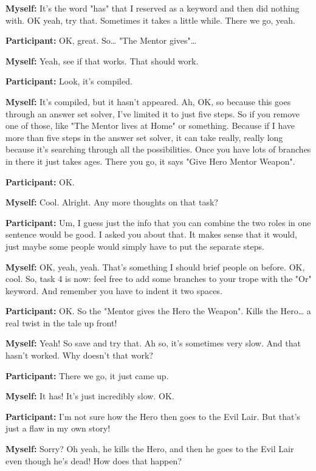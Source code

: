 \documentclass[11pt]{report}
\newcommand{\llabel}[1]{\hypertarget{llineno:#1}{\linelabel{#1}}}
\begin{document}
\begin{linenumbers}
\textbf{Myself:} It's the word "has" that I reserved as a keyword and then did nothing with. OK yeah, try that. Sometimes it takes a little while. There we go, yeah.

\textbf{Participant:} OK, great. So\ldots{} "The Mentor gives"\ldots{}

\textbf{Myself:} Yeah, see if that works. That should work.

\textbf{Participant:} Look, it's compiled.

\textbf{Myself:} It's compiled, but it hasn't appeared. Ah, OK, so because this
goes through an answer set solver, I've limited it to just five steps. So if you
remove one of those, like "The Mentor lives at Home" or something. Because if I
have more than five steps in the answer set solver, it can take really, really
long because it's searching through all the possibilities. Once you have lots of
branches in there it just takes ages. There you go, it says "Give Hero Mentor
Weapon".\llabel{lne:bug1a}

\textbf{Participant:} OK.

\textbf{Myself:} Cool. Alright. Any more thoughts on that task?

\textbf{Participant:} Um, I guess just the info that you can combine the two roles in one sentence would be good. I asked you about that. It makes sense that it would, just maybe some people would simply have to put the separate steps.

\textbf{Myself:} OK, yeah, yeah. That's something I should brief people on before. OK, cool. So, task 4 is now: feel free to add some branches to your trope with the "Or" keyword. And remember you have to indent it two spaces.

\textbf{Participant:} OK. So the "Mentor gives the Hero the Weapon". Kills the Hero\ldots{} a real twist in the tale up front!

\textbf{Myself:} Yeah! So save and try that. Ah so, it's sometimes very slow. And that hasn't worked. Why doesn't that work?

\textbf{Participant:} There we go, it just came up.

\textbf{Myself:} It has! It's just incredibly slow. OK.

\textbf{Participant:} I'm not sure how the Hero then goes to the Evil Lair. But
that's just a flaw in my own story!\llabel{lne:feature4a}

\textbf{Myself:} Sorry? Oh yeah, he kills the Hero, and then he goes to the Evil Lair even though he's dead! How does that happen?


\end{linenumbers}
\end{document}
